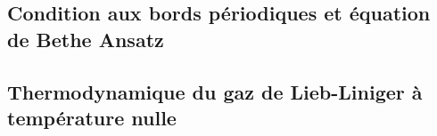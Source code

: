 \subsection{Condition aux bords périodiques et équation de Bethe Ansatz}

\subsection{Thermodynamique du gaz de Lieb-Liniger à température nulle}
